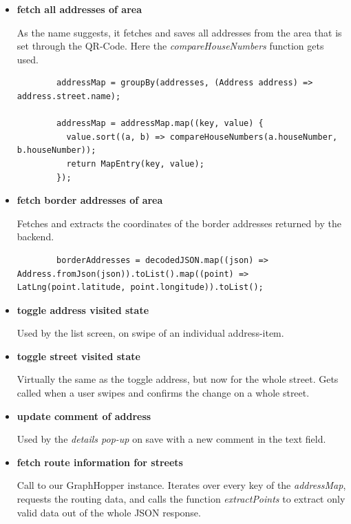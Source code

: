 \begin{itemize}
    \item \textbf{fetch all addresses of area}
    
    As the name suggests, it fetches and saves all addresses from the area that is set through the QR-Code. Here the \textit{compareHouseNumbers} function gets used.

    \begin{verbatim}
        addressMap = groupBy(addresses, (Address address) => address.street.name);

        addressMap = addressMap.map((key, value) {
          value.sort((a, b) => compareHouseNumbers(a.houseNumber, b.houseNumber));
          return MapEntry(key, value);
        });
    \end{verbatim}

    \item \textbf{fetch border addresses of area}

    Fetches and extracts the coordinates of the border addresses returned by the backend.

    \begin{verbatim}
        borderAddresses = decodedJSON.map((json) => Address.fromJson(json)).toList().map((point) => LatLng(point.latitude, point.longitude)).toList();
    \end{verbatim}

    \item \textbf{toggle address visited state}
    
    Used by the list screen, on swipe of an individual address-item.

    \item \textbf{toggle street visited state}
    
    Virtually the same as the toggle address, but now for the whole street. Gets called when a user swipes and confirms the change on a whole street.

    \item \textbf{update comment of address}
    
    Used by the \textit{details pop-up} on save with a new comment in the text field.

    \item \textbf{fetch route information for streets}
    
    Call to our GraphHopper instance. Iterates over every key of the \textit{addressMap}, requests the routing data, and calls the function \textit{extractPoints} to extract only valid data out of the whole JSON response.
\end{itemize}

